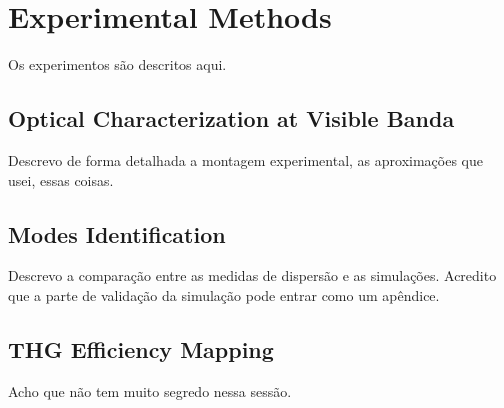 \chapter{Experimental Methods}
Os experimentos são descritos aqui. 

\section{Optical Characterization at Visible Banda}
Descrevo de forma detalhada a montagem experimental, as aproximações que usei, essas coisas. 

\section{Modes Identification}
Descrevo a comparação entre as medidas de dispersão e as simulações. Acredito que a parte de validação da simulação pode entrar como um apêndice. 

\section{THG Efficiency Mapping}
Acho que não tem muito segredo nessa sessão. 